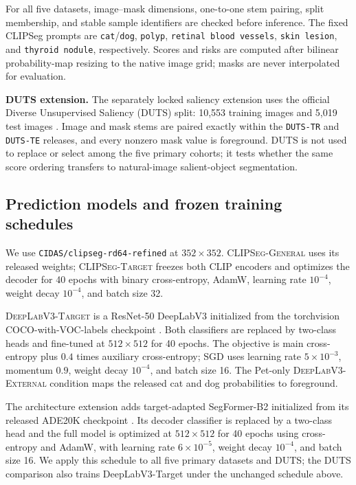 For all five datasets, image--mask dimensions, one-to-one stem pairing, split
membership, and stable sample identifiers are checked before inference. The
fixed CLIPSeg prompts are \texttt{cat}/\texttt{dog}, \texttt{polyp},
\texttt{retinal blood vessels}, \texttt{skin lesion}, and
\texttt{thyroid nodule}, respectively. Scores and risks are computed after
bilinear probability-map resizing to the native image grid; masks are never
interpolated for evaluation.

\noindent\textbf{DUTS extension.}
The separately locked saliency extension uses the official Diverse Unsupervised
Saliency (DUTS) split: 10,553 training images and 5,019 test images
\citep{wang2017duts}. Image and mask stems are paired exactly within the
\texttt{DUTS-TR} and \texttt{DUTS-TE} releases, and every nonzero mask value is
foreground. DUTS is not used to replace or select among the five primary
cohorts; it tests whether the same score ordering transfers to natural-image
salient-object segmentation.

\subsection{Prediction models and frozen training schedules}

We use \texttt{CIDAS/clipseg-rd64-refined} \citep{clipseg} at
\(352\times352\). \textsc{CLIPSeg-General} uses its released weights;
\textsc{CLIPSeg-Target} freezes both CLIP encoders and optimizes the decoder
for 40 epochs with binary cross-entropy, AdamW, learning rate \(10^{-4}\),
weight decay \(10^{-4}\), and batch size 32.

\textsc{DeepLabV3-Target} is a ResNet-50 DeepLabV3 initialized from the
torchvision COCO-with-VOC-labels checkpoint \citep{deeplabv3}. Both classifiers
are replaced by two-class heads and fine-tuned at \(512\times512\) for 40
epochs. The objective is main cross-entropy plus \(0.4\) times auxiliary
cross-entropy; SGD uses learning rate \(5\times10^{-3}\), momentum \(0.9\),
weight decay \(10^{-4}\), and batch size 16. The Pet-only
\textsc{DeepLabV3-External} condition maps the released cat and dog
probabilities to foreground.

The architecture extension adds target-adapted SegFormer-B2 initialized from
its released ADE20K checkpoint \citep{xie2021segformer}. Its decoder classifier
is replaced by a two-class head and the full model is optimized at
\(512\times512\) for 40 epochs using cross-entropy and AdamW, with learning rate
\(6\times10^{-5}\), weight decay \(10^{-4}\), and batch size 16. We apply this
schedule to all five primary datasets and DUTS; the DUTS comparison also trains
DeepLabV3-Target under the unchanged schedule above.

